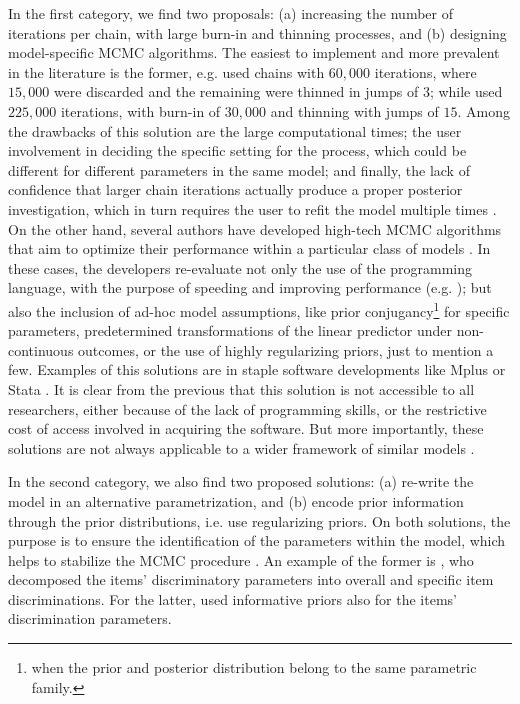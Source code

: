 In the first category, we find two proposals: (a) increasing the number of iterations per chain, with large burn-in and thinning processes, and (b) designing model-specific MCMC algorithms. The easiest to implement and more prevalent in the literature is the former, e.g. \citet{Fujimoto_2018a} used chains with $60,000$ iterations, where $15,000$ were discarded and the remaining were thinned in jumps of $3$; while \citet{Fujimoto_2018b} used $225,000$ iterations, with burn-in of $30,000$ and thinning with jumps of $15$. Among the drawbacks of this solution are the large computational times; the user involvement in deciding the specific setting for the process, which could be different for different parameters in the same model; and finally, the lack of confidence that larger chain iterations actually produce a proper posterior investigation, which in turn requires the user to refit the model multiple times \cite{Fujimoto_2018a}. On the other hand, several authors have developed high-tech MCMC algorithms that aim to optimize their performance within a particular class of models \cite{Papaspiliopoulos_et_al_2007}. In these cases, the developers re-evaluate not only the use of the programming language, with the purpose of speeding and improving performance (e.g. \citet{Fujimoto_2018a}); but also the inclusion of ad-hoc model assumptions, like prior conjugancy\footnote{when the prior and posterior distribution belong to the same parametric family.} for specific parameters, predetermined transformations of the linear predictor under non-continuous outcomes, or the use of highly regularizing priors, just to mention a few. Examples of this solutions are in staple software developments like Mplus \cite{Muthen_et_al_2011} or Stata \cite{Rabe_et_al_2004c}. It is clear from the previous that this solution is not accessible to all researchers, either because of the lack of programming skills, or the restrictive cost of access involved in acquiring the software. But more importantly, these solutions are not always applicable to a wider framework of similar models \cite{Papaspiliopoulos_et_al_2007}.

In the second category, we also find two proposed solutions: (a) re-write the model in an alternative parametrization, and (b) encode prior information through the prior distributions, i.e. use regularizing priors. On both solutions, the purpose is to ensure the identification of the parameters within the model, which helps to stabilize the MCMC procedure \cite{Gelman_et_al_2014}. An example of the former is \citet{Fujimoto_2018a}, who decomposed the items' discriminatory parameters into overall and specific item discriminations. For the latter, \citet{Fujimoto_2020} used informative priors also for the items' discrimination parameters.

